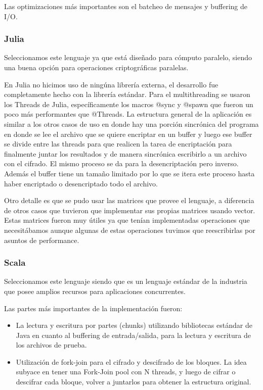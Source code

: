 \documentclass[11pt]{article}
\let\Oldsubsubsection\subsubsection
\renewcommand{\subsubsection}{\FloatBarrier\Oldsubsubsection}
\begin{document}
Las optimizaciones más importantes son el batcheo de mensajes y buffering de I/O.

\subsubsection{Julia}

Seleccionamos este lenguaje ya que está diseñado para cómputo paralelo, siendo una buena opción para operaciones criptográficas paralelas.

En Julia no hicimos uso de ningúna librería externa, el desarrollo fue completamente hecho con la librería estándar. Para el multithreading se usaron los Threads de Julia, específicamente los macros @sync y @spawn que fueron un poco más performantes que @Threads. La estructura general de la aplicación es similar a los otros casos de uso en donde hay una porción sincrónica del programa en donde se lee el archivo que se quiere encriptar en un buffer y luego ese buffer se divide entre las threads para que realicen la tarea de encriptación para finalmente juntar los resultados y de manera sincrónica escribirlo a un archivo con el cifrado. El mismo proceso se da para la desencriptación pero inverso. Además el buffer tiene un tamaño limitado por lo que se itera este proceso hasta haber encriptado o desencriptado todo el archivo.

Otro detalle es que se pudo usar las matrices que provee el lenguaje, a diferencia de otros casos que tuvieron que implementar sus propias matrices usando vector. Estas matrices fueron muy útiles ya que tenían implementadas operaciones que necesitábamos aunque algunas de estas operaciones tuvimos que reescribirlas por asuntos de performance.

\subsubsection{Scala}

Seleccionamos este lenguaje siendo que es un lenguaje estándar de la industria que posee amplios recursos para aplicaciones concurrentes.

Las partes más importantes de la implementación fueron:

\begin{itemize}
    \item La lectura y escritura por partes (chunks) utilizando bibliotecas estándar de Java en cuanto al buffering de entrada/salida, para la lectura y escritura de los archivos de prueba.
    \item Utilización de fork-join para el cifrado y descifrado de los bloques. La idea subyace en tener una Fork-Join pool con N threads, y luego de cifrar o descifrar cada bloque, volver a juntarlos para obtener la estructura original.
\end{itemize}
\end{document}
